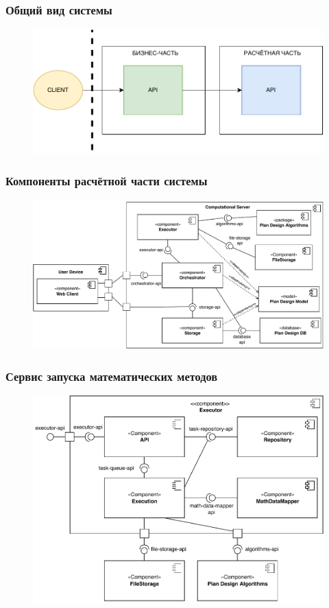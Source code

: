\begin{frame}
\frametitle{Общий вид системы}
\begin{figure}
    \includegraphics[scale=.9]{pictures/architecture/system}
\end{figure}
\end{frame}

\begin{frame}
\frametitle{Компоненты расчётной части системы}
\begin{figure}
    \includegraphics[scale=.6]{pictures/architecture/component}
\end{figure}
\end{frame}


\begin{frame}
\frametitle{Сервис запуска математических методов}
\begin{figure}
    \includegraphics[scale=.6]{pictures/architecture/executor_component_common}
\end{figure}
\end{frame}

